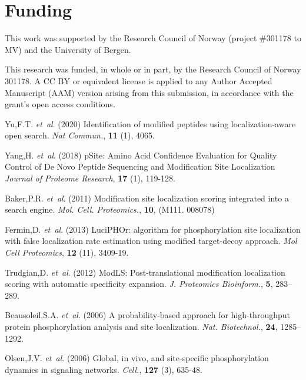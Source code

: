 \documentclass{bioinfo}
\begin{document}
\section*{Funding}

This work was supported by the Research Council of Norway (project \#301178 to MV) and the University of Bergen.

This research was funded, in whole or in part, by the Research Council of Norway 301178. A CC BY or equivalent license is applied to any Author Accepted Manuscript (AAM) version arising from this submission, in accordance with the grant’s open access conditions.

%
%
%
%
%
%
%
%
%


\begin{thebibliography}{}

Yu,F.T. {\it et~al}. (2020) Identification of modified peptides using localization-aware open search. {\it Nat Commun.}, {\bf 11} (1), 4065.

Yang,H. {\it et~al}. (2018) pSite: Amino Acid Confidence Evaluation for Quality Control of De Novo Peptide Sequencing and Modification Site Localization {\it Journal of Proteome Research}, {\bf 17} (1), 119-128.

Baker,P.R. {\it et~al}. (2011) Modification site localization scoring integrated into a search engine.
{\it Mol. Cell. Proteomics.}, {\bf 10}, (M111. 008078)

Fermin,D. {\it et~al}. (2013) LuciPHOr: algorithm for phosphorylation site localization with false localization rate estimation using modified target-decoy approach. {\it Mol Cell Proteomics}, {\bf 12} (11), 3409-19.

Trudgian,D. {\it et~al}. (2012) ModLS: Post-translational modification localization scoring with automatic specificity expansion. {\it J. Proteomics Bioinform.}, {\bf 5}, 283–289.

Beausoleil,S.A. {\it et~al}. (2006) A probability-based approach for high-throughput protein phosphorylation analysis and site localization. {\it Nat. Biotechnol.}, {\bf 24}, 1285–1292.

Olsen,J.V. {\it et~al}. (2006) Global, in vivo, and site-specific phosphorylation dynamics in signaling networks. {\it Cell.}, {\bf 127} (3), 635-48.




\end{thebibliography}
\end{document}
